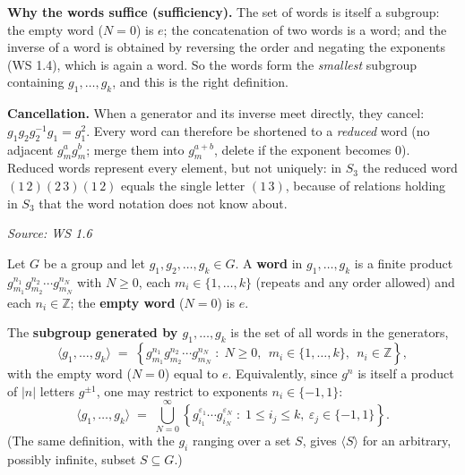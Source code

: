 \documentclass[11pt]{report}
\newcommand{\srcline}[1]{\par\hfill{\footnotesize\textit{Source: #1}}}
\begin{document}
\begin{exbox}
\textbf{Why the words suffice (sufficiency).} The set of words is itself a subgroup: the empty word ($N = 0$) is $e$; the concatenation of two words is a word; and the inverse of a word is obtained by reversing the order and negating the exponents (WS 1.4), which is again a word. So the words form the \emph{smallest} subgroup containing $g_1, \ldots, g_k$, and this is the right definition.

\textbf{Cancellation.} When a generator and its inverse meet directly, they cancel: $g_1 g_2 g_2^{-1} g_1 = g_1^2$. Every word can therefore be shortened to a \emph{reduced} word (no adjacent $g_m^{a} g_m^{b}$; merge them into $g_m^{a+b}$, delete if the exponent becomes $0$). Reduced words represent every element, but not uniquely: in $S_3$ the reduced word $(1\,2)(2\,3)(1\,2)$ equals the single letter $(1\,3)$, because of relations holding in $S_3$ that the word notation does not know about.
\srcline{WS 1.6}
\end{exbox}

\begin{defbox}[{Word}]\label{def:word-subgroup-generated-several-elements}
Let $G$ be a group and let $g_1, g_2, \ldots, g_k \in G$. A \textbf{word} in $g_1, \ldots, g_k$ is a finite product $g_{m_1}^{n_1} g_{m_2}^{n_2} \cdots g_{m_N}^{n_N}$ with $N \geq 0$, each $m_i \in \{1, \ldots, k\}$ (repeats and any order allowed) and each $n_i \in \mathbb{Z}$; the \textbf{empty word} ($N = 0$) is $e$.
\end{defbox}

\begin{defbox}\label{def:subgroup-generated-several-elements}
The \textbf{subgroup generated by $g_1, \ldots, g_k$} is the set of all words in the generators,
\[ \langle g_1, \ldots, g_k \rangle \;=\; \left\{ g_{m_1}^{n_1} g_{m_2}^{n_2} \cdots g_{m_N}^{n_N} \;:\; N \geq 0,\ \ m_i \in \{1, \ldots, k\},\ \ n_i \in \mathbb{Z} \right\}, \]
with the empty word ($N = 0$) equal to $e$. Equivalently, since $g^{n}$ is itself a product of $|n|$ letters $g^{\pm 1}$, one may restrict to exponents $n_i \in \{-1, 1\}$:
\[ \langle g_1, \ldots, g_k \rangle \;=\; \bigcup_{N=0}^{\infty} \left\{ g_{i_1}^{\varepsilon_1} \cdots g_{i_N}^{\varepsilon_N} \;:\; 1 \leq i_j \leq k,\ \varepsilon_j \in \{-1, 1\} \right\}. \]
(The same definition, with the $g_i$ ranging over a set $S$, gives $\langle S \rangle$ for an arbitrary, possibly infinite, subset $S \subseteq G$.)
\end{defbox}
\end{document}
